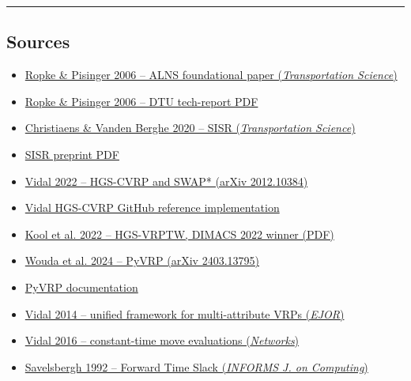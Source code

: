 \documentclass[twocolumn,10pt,letterpaper]{article}
\begin{document}
\vspace{0.5em}
\noindent\rule{\columnwidth}{0.4pt}
\vspace{0.5em}

\subsection{Sources}

\begin{itemize}
\setlength{\itemsep}{0pt}
\setlength{\parskip}{0pt}
  \item \href{https://www.sciencedirect.com/science/article/abs/pii/S0305054805003023}{Ropke \& Pisinger 2006 -- ALNS foundational paper (\textit{Transportation Science})}
  \item \href{https://backend.orbit.dtu.dk/ws/portalfiles/portal/3154899/An\%20adaptive\%20large\%20neighborhood\%20search\%20heuristic\%20for\%20the\%20pickup\%20and\%20delivery\%20problem\%20with\%20time\%20windows\_TechRep\_ropke\_pisinger.pdf}{Ropke \& Pisinger 2006 -- DTU tech-report PDF}
  \item \href{https://pubsonline.informs.org/doi/10.1287/trsc.2019.0914}{Christiaens \& Vanden Berghe 2020 -- SISR (\textit{Transportation Science})}
  \item \href{https://scispace.com/pdf/slack-induction-by-string-removals-for-vehicle-routing-14gqwirdlp.pdf}{SISR preprint PDF}
  \item \href{https://arxiv.org/abs/2012.10384}{Vidal 2022 -- HGS-CVRP and SWAP* (arXiv 2012.10384)}
  \item \href{https://github.com/vidalt/HGS-CVRP}{Vidal HGS-CVRP GitHub reference implementation}
  \item \href{https://wouterkool.github.io/pdf/paper-kool-hgs-vrptw.pdf}{Kool et al. 2022 -- HGS-VRPTW, DIMACS 2022 winner (PDF)}
  \item \href{https://arxiv.org/pdf/2403.13795}{Wouda et al. 2024 -- PyVRP (arXiv 2403.13795)}
  \item \href{https://pyvrp.org/}{PyVRP documentation}
  \item \href{https://www.sciencedirect.com/science/article/abs/pii/S0377221713005547}{Vidal 2014 -- unified framework for multi-attribute VRPs (\textit{EJOR})}
  \item \href{https://doi.org/10.1002/net.21693}{Vidal 2016 -- constant-time move evaluations (\textit{Networks})}
  \item \href{https://pubsonline.informs.org/doi/10.1287/ijoc.4.2.146}{Savelsbergh 1992 -- Forward Time Slack (\textit{INFORMS J. on Computing})}

\end{itemize}
\end{document}

